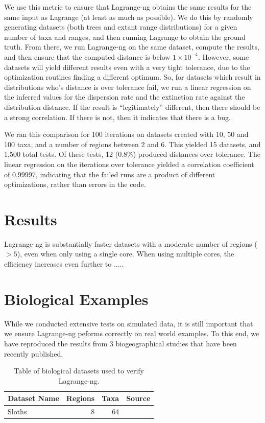 \documentclass[oupdraft]{sysbio}
\begin{document}
We use this metric to ensure that Lagrange-ng obtains the same results for the same input as Lagrange (at least as much
as possible). We do this by randomly generating datasets (both trees and extant range distributions) for a given number
of taxa and ranges, and then running Lagrange to obtain the ground truth. From there, we run Lagrange-ng on the same
dataset, compute the results, and then ensure that the computed distance is below $1\times 10^{-4}$. However, some
datasets will yield different results even with a very tight tolerance, due to the optimization routines finding a
different optimum. So, for datasets which result in distributions who's distance is over tolerance fail, we run a linear
regression on the inferred values for the dispersion rate and the extinction rate against the distribution distance. If
the result is ``legitimately'' different, then there should be a strong correlation. If there is not, then it indicates
that there is a bug.

We ran this comparison for 100 iterations on datasets created with 10, 50 and 100 taxa, and a number of regions between
2 and 6. This yielded 15 datasets, and 1,500 total tests. Of these tests, 12 ($0.8\%$) produced distances over
tolerance. The linear regression on the iterations over tolerance yielded a correlation coefficient of $0.99997$,
indicating that the failed runs are a product of different optimizations, rather than errors in the code.

\section{Results}\label{sec:Results}

Lagrange-ng is substantially faster datasets with a moderate number of regions ($>5$), even when only using a single
core. When using multiple cores, the efficiency increases even further to .....

\section{Biological Examples}\label{sec:bio-examples}

While we conducted extensive tests on simulated data, it is still important that we ensure Lagrange-ng peforms correctly
on real world examples. To this end, we have reproduced the results from 3 biogeographical studies that have been
recently published.

\begin{table}
  \caption{Table of biological datasets used to verify Lagrange-ng.}
  \label{tab:}
  \begin{center}
    \begin{tabular}[c]{l|r|r|r}
      \hline
      \multicolumn{1}{c|}{\textbf{Dataset Name}} & 
      \multicolumn{1}{c|}{\textbf{Regions}} & 
      \multicolumn{1}{c|}{\textbf{Taxa}} & 
      \multicolumn{1}{c}{\textbf{Source}} \\
      \hline
      Sloths & 8 & 64 & \citet{varela_phylogeny_2019}\\
      \hline
    \end{tabular}
  \end{center}
\end{table}
\end{document}
